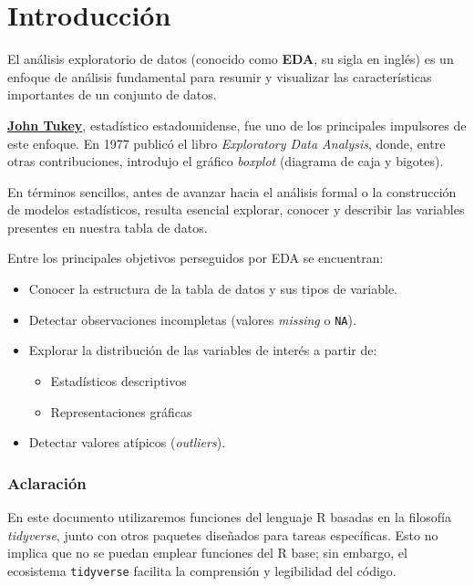 \documentclass[
  spanish,
  letterpaper,
  DIV=11,
  numbers=noendperiod]{scrreprt}
\providecommand{\tightlist}{%
  \setlength{\itemsep}{0pt}\setlength{\parskip}{0pt}}
\begin{document}
\section{Introducción}\label{introducciuxf3n-1}

El análisis exploratorio de datos (conocido como \textbf{EDA}, su sigla
en inglés) es un enfoque de análisis fundamental para resumir y
visualizar las características importantes de un conjunto de datos.

\href{https://es.wikipedia.org/wiki/John_W._Tukey}{\textbf{John Tukey}},
estadístico estadounidense, fue uno de los principales impulsores de
este enfoque. En 1977 publicó el libro \emph{Exploratory Data Analysis},
donde, entre otras contribuciones, introdujo el gráfico \emph{boxplot}
(diagrama de caja y bigotes).

En términos sencillos, antes de avanzar hacia el análisis formal o la
construcción de modelos estadísticos, resulta esencial explorar, conocer
y describir las variables presentes en nuestra tabla de datos.

Entre los principales objetivos perseguidos por EDA se encuentran:

\begin{itemize}
\tightlist
\item
  Conocer la estructura de la tabla de datos y sus tipos de variable.
\item
  Detectar observaciones incompletas (valores \emph{missing} o
  \texttt{NA}).
\item
  Explorar la distribución de las variables de interés a partir de:

  \begin{itemize}
  \tightlist
  \item
    Estadísticos descriptivos
  \item
    Representaciones gráficas
  \end{itemize}
\item
  Detectar valores atípicos (\emph{outliers}).
\end{itemize}

\subsubsection{Aclaración}\label{aclaraciuxf3n}

En este documento utilizaremos funciones del lenguaje R basadas en la
filosofía \emph{tidyverse}, junto con otros paquetes diseñados para
tareas específicas. Esto no implica que no se puedan emplear funciones
del R base; sin embargo, el ecosistema \texttt{tidyverse} facilita la
comprensión y legibilidad del código.
\end{document}
